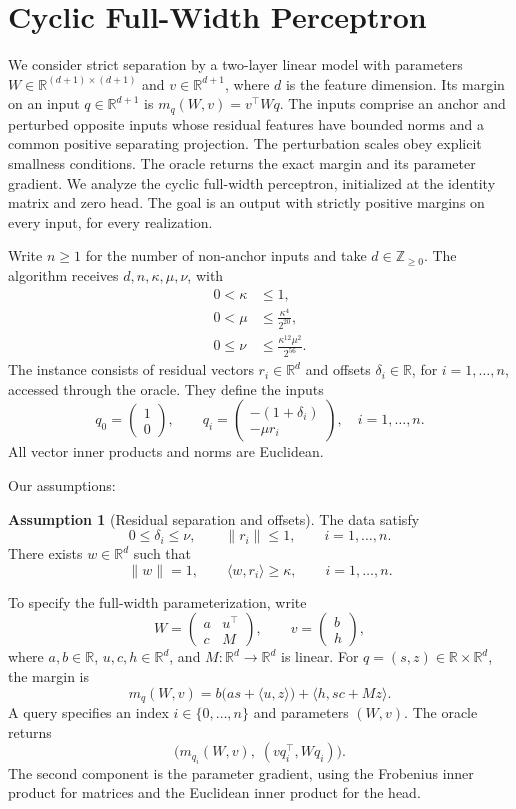 \documentclass[10pt]{article}
\theoremstyle{definition}
\newtheorem{assumption}{Assumption}
\begin{document}
\section*{Cyclic Full-Width Perceptron}
We consider strict separation by a two-layer linear model with parameters $W\in\mathbb{R}^{(d+1)\times(d+1)}$ and $v\in\mathbb{R}^{d+1}$, where $d$ is the feature dimension. Its margin on an input $q\in\mathbb{R}^{d+1}$ is $m_q(W,v)=v^\top Wq$. The inputs comprise an anchor and perturbed opposite inputs whose residual features have bounded norms and a common positive separating projection. The perturbation scales obey explicit smallness conditions. The oracle returns the exact margin and its parameter gradient. We analyze the cyclic full-width perceptron, initialized at the identity matrix and zero head. The goal is an output with strictly positive margins on every input, for every realization.

Write $n\geq 1$ for the number of non-anchor inputs and take $d\in\mathbb{Z}_{\geq 0}$. The algorithm receives $d,n,\kappa,\mu,\nu$, with
\[
\begin{aligned}
0<\kappa&\leq 1,\\
0<\mu&\leq \frac{\kappa^4}{2^{20}},\\
0\leq\nu&\leq \frac{\kappa^{12}\mu^2}{2^{56}}.
\end{aligned}
\]
The instance consists of residual vectors $r_i\in\mathbb{R}^d$ and offsets $\delta_i\in\mathbb{R}$, for $i=1,\ldots,n$, accessed through the oracle. They define the inputs
\[
q_0=\begin{pmatrix}1\\0\end{pmatrix},
\qquad
q_i=\begin{pmatrix}-(1+\delta_i)\\-\mu r_i\end{pmatrix},
\quad i=1,\ldots,n.
\]
All vector inner products and norms are Euclidean.

Our assumptions:
\begin{assumption}[Residual separation and offsets]
The data satisfy
\[
0\leq\delta_i\leq\nu,
\qquad \|r_i\|\leq 1,
\qquad i=1,\ldots,n.
\]
There exists $w\in\mathbb{R}^d$ such that
\[
\|w\|=1,
\qquad \langle w,r_i\rangle\geq\kappa,
\qquad i=1,\ldots,n.
\]
\end{assumption}

To specify the full-width parameterization, write
\[
W=\begin{pmatrix}a&u^\top\\c&M\end{pmatrix},
\qquad
v=\begin{pmatrix}b\\h\end{pmatrix},
\]
where $a,b\in\mathbb{R}$, $u,c,h\in\mathbb{R}^d$, and $M:\mathbb{R}^d\to\mathbb{R}^d$ is linear. For $q=(s,z)\in\mathbb{R}\times\mathbb{R}^d$, the margin is
\[
m_q(W,v)=b\bigl(as+\langle u,z\rangle\bigr)
+\langle h,sc+Mz\rangle.
\]
A query specifies an index $i\in\{0,\ldots,n\}$ and parameters $(W,v)$. The oracle returns
\[
\bigl(m_{q_i}(W,v),\; (vq_i^\top,Wq_i)\bigr).
\]
The second component is the parameter gradient, using the Frobenius inner product for matrices and the Euclidean inner product for the head.
\end{document}
